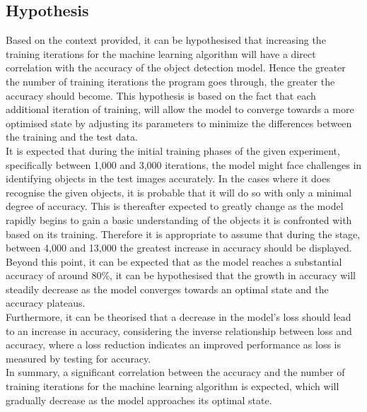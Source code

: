 \subsection{Hypothesis}
Based on the context provided, it can be hypothesised that increasing the training iterations for the machine learning algorithm will have a direct correlation with the accuracy of the object detection model. Hence the greater the number of training iterations the program goes through, the greater the accuracy should become. This hypothesis is based on the fact that each additional iteration of training, will allow the model to converge towards a more optimised state by adjusting its parameters to minimize the differences between the training and the test data.\\


It is expected that during the initial training phases of the given experiment, specifically between 1,000 and 3,000 iterations, the model might face challenges in identifying objects in the test images accurately. In the cases where it does recognise the given objects, it is probable that it will do so with only a minimal degree of accuracy. This is thereafter expected to greatly change as the model rapidly begins to gain a basic understanding of the objects it is confronted with based on its training. Therefore it is appropriate to assume that during the stage, between  4,000 and 13,000 the greatest increase in accuracy should be displayed.  Beyond this point, it can be expected that as the model reaches a substantial accuracy of around 80\%, it can be hypothesised that the growth in accuracy will steadily decrease as the model converges towards an optimal state and the accuracy plateaus.\\


Furthermore, it can be theorised that a decrease in the model's loss should lead to an increase in accuracy, considering the inverse relationship between loss and accuracy, where a loss reduction indicates an improved performance as loss is measured by testing for accuracy.\\


In summary, a significant correlation between the accuracy and the number of training iterations for the machine learning algorithm is expected, which will gradually decrease as the model approaches its optimal state.


